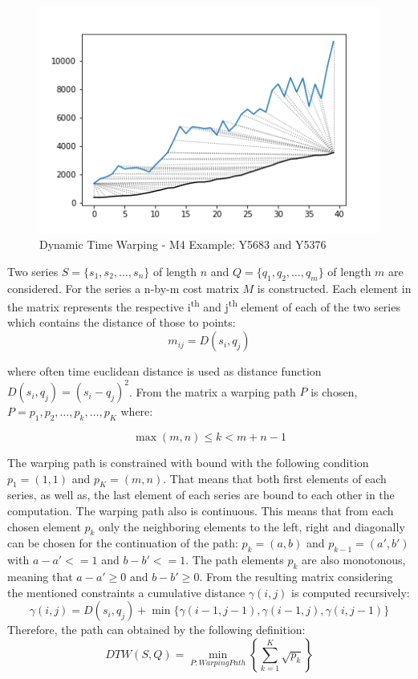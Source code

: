 \documentclass[phd,black, hidelinks]{PrincetonThesis}
\begin{document}
\begin{figure}[htbp]
\centering
\includegraphics[width=.9\linewidth]{./img/dtw_ex_plain.png}
\caption{\label{fig:orgcbebb14}Dynamic Time Warping - M4 Example: Y5683 and Y5376}
\end{figure}

Two series \(S = \{s_1, s_2, \dots, s_n\}\) of length \(n\) and \(Q = \{q_1, q_2, \dots, q_m\}\) of length \(m\) are considered. For the series a n-by-m cost matrix \(M\) is constructed. Each element in the matrix represents the respective i\textsuperscript{th} and j\textsuperscript{th} element of each of the two series which contains the distance of those to points:
\begin{equation}
m_{ij} = D(s_i, q_j)
\end{equation}

where often time euclidean distance is used as distance function \(D(s_i, q_j) = (s_i - q_j)^2\). From the matrix a warping path \(P\) is chosen, \(P = p_1,p_2,\dots, p_k, \dots, p_K\) where:

\begin{equation}
\max(m,n) \leq k < m+n-1
\end{equation}

The warping path is constrained with bound with the following condition \(p_1 = (1,1)\) and \(p_K = (m,n)\). That means that both first elements of each series, as well as, the last element of each series are bound to each other in the computation. The warping path also is continuous. This means that from each chosen element \(p_k\) only the neighboring elements to the left, right and diagonally can be chosen for the continuation of the path: \(p_k= (a,b)\) and \(p_{k-1} = (a',b')\) with \(a-a' <=1\) and \(b-b' <= 1\). The path elements \(p_k\) are also monotonous, meaning that \(a-a' \geq 0\) and \(b-b' \geq 0\). From the resulting matrix considering the mentioned constraints a cumulative distance \(\gamma(i,j)\) is computed recursively:
\begin{equation}
\gamma(i,j) = D(s_i,q_j) + \min \{\gamma(i-1, j-1), \gamma(i-1, j), \gamma(i, j-1)\}
\end{equation}
Therefore, the path can obtained by the following definition:
\begin{equation}
DTW(S,Q) = \min_{P: Warping Path}\left\{\sum_{k=1}^K \sqrt{p_k}\right\}
\end{equation}
\end{document}

